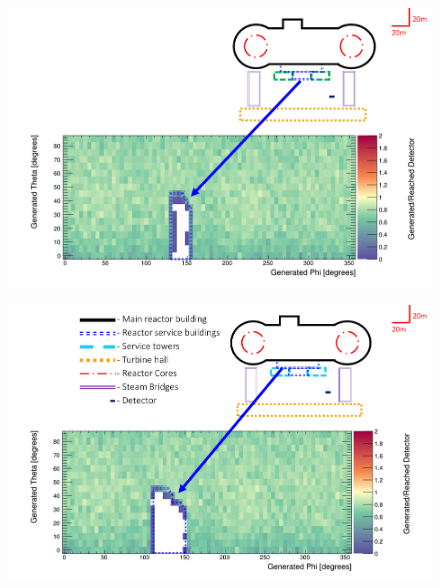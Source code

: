 \begin{figure}
 \centering
 \includegraphics[width=\linewidth]{Chapter5/Figs/wylfaRasterNew/serviceBuildClose.png}
 \label{fig:serviceBuildClose}
\end{figure}

\begin{figure}
 \centering
 \includegraphics[width=\linewidth]{Chapter5/Figs/wylfaRasterNew/serviceBuildFar.png}
 \label{fig:serviceBuildFar}
\end{figure}

